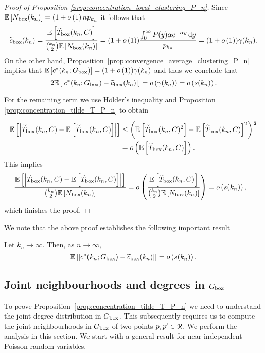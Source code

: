 \begin{proof}[Proof of Proposition \ref{prop:concentration_local_clustering_P_n}]
Since $\mathbb{E}\left[N_{\text{box}}(k_n)\right] = (1+o\left(1\right)n p_{k_n}$ it follows that
\[
	\widetilde{c}_{\text{box}}(k_n) = \frac{\mathbb{E}\left[\widetilde{T}_{\text{box}}(k_n,C)\right]}{\binom{k_n}{2}\mathbb{E}\left[N_{\text{box}}(k_n)\right]}
	= (1+o\left(1\right)) \frac{\int_0^\infty P(y) \alpha e^{-\alpha y} \operatorname{\mathrm{d}\hspace{-2pt}} y}{p_{k_n}}
	= (1 + o\left(1\right)) \gamma(k_n).
\]
On the other hand, Proposition~\ref{prop:convergence_average_clustering_P_n} implies that $\mathbb{E}\left[c^\ast(k_n; G_{\text{box}})\right] = (1+o\left(1\right))\gamma(k_n)$ and thus we conclude that
\[
	2\mathbb{E}\left[\left|c^\ast(k_n; G_{\text{box}}) - \widetilde{c}_{\text{box}}(k_n)\right|\right]
	= o\left(\gamma(k_n)\right) = o\left(s(k_n)\right).	
\]

For the remaining term we use H\"{o}lder's inequality and Proposition \ref{prop:concentration_tilde_T_P_n} to obtain
\begin{align*}
	\mathbb{E}\left[\left|\widetilde{T}_{\text{box}}(k_n,C) - \mathbb{E}\left[\widetilde{T}_{\text{box}}(k_n,C)\right]\right|\right]
	&\le \left(\mathbb{E}\left[\widetilde{T}_{\text{box}}(k_n,C)^2\right] 
		- \mathbb{E}\left[\widetilde{T}_{\text{box}}(k_n,C)\right]^2\right)^{\frac{1}{2}}\\
	&= o\left(\mathbb{E}\left[\widetilde{T}_{\text{box}}(k_n,C)\right]\right).
\end{align*}
This implies
\begin{align*}
	\frac{\mathbb{E}\left[\left|\widetilde{T}_{\text{box}}(k_n,C) - \mathbb{E}\left[\widetilde{T}_{\text{box}}(k_n,C)\right]\right|\right]}
		{\binom{k_n}{2}\mathbb{E}\left[N_{\text{box}}(k_n)\right]}
	&= o\left(\frac{\mathbb{E}\left[\widetilde{T}_{\text{box}}(k_n,C)\right]}{\binom{k_n}{2}\mathbb{E}\left[N_{\text{box}}(k_n)\right]}\right)
	= o\left(s(k_n)\right),
\end{align*}
which finishes the proof.
\end{proof}

We note that the above proof establishes the following important result

\begin{corollary}\label{cor:c_ast_box_2_tilde_c_box}
Let $k_n \to \infty$. Then, as $n \to \infty$,
\[
	\mathbb{E}\left[\left|c^\ast(k_n; G_{\text{box}}) - \widetilde{c}_{\text{box}}(k_n)\right|\right] = o\left(s(k_n)\right).
\]
\end{corollary}

\subsection{Joint neighbourhoods and degrees in $G_{\text{box}}$}

To prove Proposition~\ref{prop:concentration_tilde_T_P_n} we need to understand the joint degree distribution in $G_{\text{box}}$. This subsequently requires us to compute the joint neighbourhoods in $G_{\text{box}}$ of two points $p, p^\prime \in {\mathcal R}$. We perform the analysis in this section. We start with a general result for near independent Poisson random variables.

